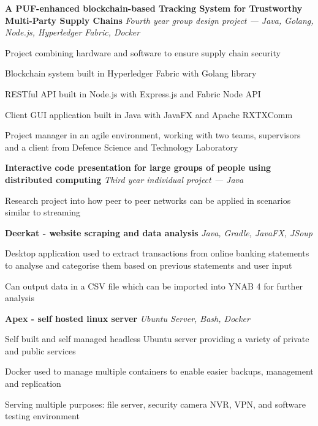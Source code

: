 
\bigskip
{}%
\textbf{A PUF-enhanced blockchain-based Tracking System for Trustworthy Multi-Party Supply Chains} \newline
\emph{Fourth year group design project --- Java, Golang, Node.js, Hyperledger Fabric, Docker} %
\begin{itemize*}
  \item Project combining hardware and software to ensure supply chain security
  \item Blockchain system built in Hyperledger Fabric with Golang library
  \item RESTful API built in Node.js with Express.js and Fabric Node API
  \item Client GUI application built in Java with JavaFX and Apache RXTXComm
  \item Project manager in an agile environment, working with two teams, supervisors and a client from Defence Science and Technology Laboratory
\end{itemize*}

\smallskip
\textbf{Interactive code presentation for large groups of people using distributed computing} \newline
\emph{Third year individual project --- Java} %
\begin{itemize*}
  \item Research project into how peer to peer networks can be applied in scenarios similar to streaming
\end{itemize*}

\smallskip
\textbf{Deerkat - website scraping and data analysis}\newline
\small{\emph{Java, Gradle, JavaFX, JSoup}}
\begin{itemize*}
  \item Desktop application used to extract transactions from online banking statements to analyse and categorise them based on previous statements and user input
  \item Can output data in a CSV file which can be imported into YNAB 4 for further analysis
\end{itemize*}

\smallskip
\textbf{Apex - self hosted linux server}\newline
\small{\emph{Ubuntu Server, Bash, Docker}}
\begin{itemize*}
  \item Self built and self managed headless Ubuntu server providing a variety of private and public services
  \item Docker used to manage multiple containers to enable easier backups, management and replication
  \item Serving multiple purposes: file server, security camera NVR, VPN, and software testing environment
\end{itemize*}
